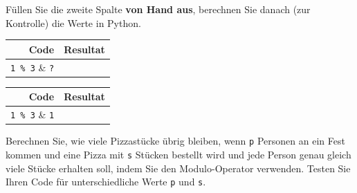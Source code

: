 \begin{myexercise}\label{ex:modulo}
	Füllen Sie die zweite Spalte \textbf{von Hand aus}, berechnen Sie danach (zur Kontrolle) die Werte in Python.
	\begin{table}[H]
		\centering
		\begin{tabular}{r|l}
			\textbf{Code}     & \textbf{Resultat} \\\midrule\midrule
			\lstinline|1 % 3| & \lstinline|?|     \\\midrule
			\lstinline|2 % 3| & \lstinline|?|     \\\midrule
			\lstinline|3 % 3| & \lstinline|?|     \\\midrule
			\lstinline|4 % 3| & \lstinline|?|     \\\midrule
			\lstinline|5 % 3| & \lstinline|?|     \\\midrule
			\lstinline|6 % 3| & \lstinline|?|     \\\midrule
		\end{tabular}
	\end{table}
	\begin{myanswer}
		\begin{table}[H]
			\centering
			\begin{tabular}{r|l}
				\textbf{Code}     & \textbf{Resultat} \\\midrule\midrule
				\lstinline|1 % 3| & \lstinline|1|     \\\midrule
				\lstinline|2 % 3| & \lstinline|2|     \\\midrule
				\lstinline|3 % 3| & \lstinline|0|     \\\midrule
				\lstinline|4 % 3| & \lstinline|1|     \\\midrule
				\lstinline|5 % 3| & \lstinline|2|     \\\midrule
				\lstinline|6 % 3| & \lstinline|0|     \\\midrule
			\end{tabular}
		\end{table}
	\end{myanswer}
\end{myexercise}

\begin{myexercise}\label{ex:modulo-pizza}
	Berechnen Sie, wie viele Pizzastücke übrig bleiben, wenn \texttt{p} Personen an ein Fest kommen und eine Pizza mit \texttt{s} Stücken bestellt wird und jede Person genau gleich viele Stücke erhalten soll, indem Sie den Modulo-Operator verwenden. Testen Sie Ihren Code für unterschiedliche Werte \texttt{p} und \texttt{s}.
	\begin{myanswer}
		
	\end{myanswer}
\end{myexercise}


